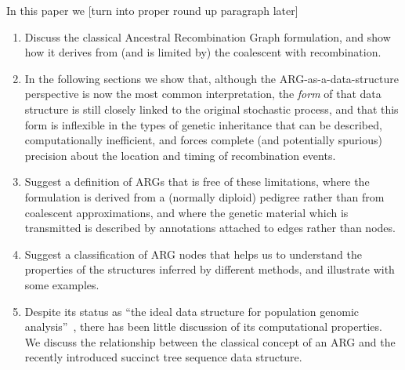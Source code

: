 \documentclass{article}
\begin{document}
In this paper we [turn into proper round up paragraph later]
\begin{enumerate}
\item Discuss the classical Ancestral Recombination Graph formulation,
and show how it derives from (and is limited by) the coalescent with
recombination.
\item In the following sections we
show that, although the ARG-as-a-data-structure perspective is
now the most common interpretation, the \emph{form} of that
data structure is still closely linked to the original
stochastic process, and that this form is inflexible
in the types of genetic inheritance that can be described,
computationally inefficient, and
forces complete (and potentially spurious) precision about
the location and timing
of recombination events. %
\item Suggest a definition of ARGs that is free of these limitations,
where the formulation is derived from a (normally diploid) pedigree rather than from
coalescent approximations, and where the genetic
material which is transmitted is described by annotations attached to
edges rather than nodes.
\item Suggest a classification of ARG nodes that helps us to understand
the properties of the structures inferred by different methods, and illustrate
with some examples.
\item Despite its status as ``the ideal data structure for
population genomic analysis''~\citep{rasmussen2014genome}, there has been
little discussion of its computational properties. We discuss the
relationship between the classical concept of an ARG and the
recently introduced succinct tree sequence data structure.
\end{enumerate}
\end{document}
